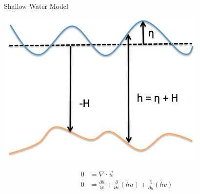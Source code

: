 \documentclass{beamer}
\begin{document}
			\begin{frame}[t]{Shallow Water Model}
				\begin{center}
					\begin{minipage}{0.45\textwidth}
						\includegraphics[width=\textwidth]{sw_diagram.png}
					\end{minipage}
					\begin{minipage}{0.45\textwidth}
						\begin{align*}
							0 &=\nabla \cdot \vec u\\
							0 &=\frac{\partial h}{\partial t} + \frac{\partial}{\partial x}(hu) + \frac{\partial}{\partial y}(hv)
						\end{align*}
					\end{minipage}
				\end{center}
			\end{frame}
\end{document}
